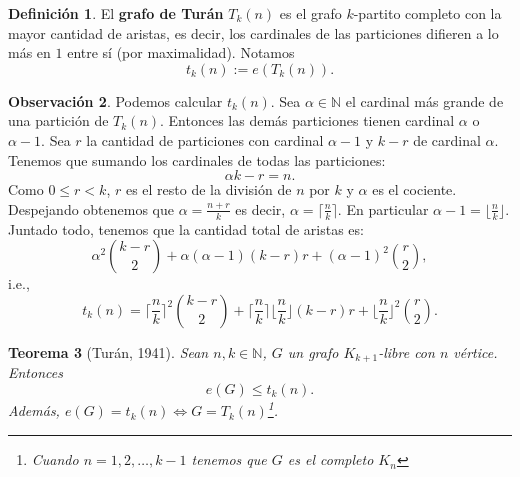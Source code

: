 \documentclass[12pt]{report}
\theoremstyle{plain}
\newtheorem{theorem}{Teorema}[section]
\theoremstyle{definition}
\newtheorem{definition}[theorem]{Definición}
\newtheorem{obs}[theorem]{Observación}
\newcommand{\naturals}{\mathbb{N}}
\begin{document}
\begin{definition}
El \textbf{grafo de Turán} $T_k (n)$ es el grafo $k$-partito completo con la mayor cantidad de aristas, es decir, los cardinales de las particiones difieren a lo más en $1$ entre sí (por maximalidad). Notamos
\[
    t_k(n) := e(T_k (n)).
\]
\end{definition}

\begin{obs}
Podemos calcular $t_k(n)$. Sea $\alpha \in \naturals$ el cardinal más grande de una partición de $T_k (n)$. Entonces las demás particiones tienen cardinal $\alpha$ o $\alpha -1$. Sea $r$ la cantidad de particiones con cardinal $\alpha -1$ y $k-r$ de cardinal $\alpha$. Tenemos que sumando los cardinales de todas las particiones:
\[
    \alpha k - r = n.
\]
Como $0 \leq r < k$, $r$ es el resto de la división de $n$ por $k$ y $\alpha$ es el cociente. Despejando obtenemos que $\alpha = \frac{n+r}{k}$ es decir, $\alpha = \lceil \frac{n}{k} \rceil$. En particular $\alpha -1 = \lfloor \frac{n}{k} \rfloor$. Juntado todo, tenemos que la cantidad total de aristas es:
\[
    \alpha^2 \binom{k-r}2 + \alpha (\alpha -1) (k-r)r + (\alpha-1)^2 \binom{r}2,
\]
i.e.,
\[
    \boxed{t_k(n) = \lceil \frac{n}{k} \rceil^2 \binom{k-r}2 + \lceil \frac{n}{k} \rceil \lfloor \frac{n}{k} \rfloor (k-r) r + \lfloor \frac{n}{k} \rfloor^2 \binom r 2.}
\]
\end{obs}


\begin{theorem}[Turán, 1941]\label{th:teorema de Turan todo grafo K_k+1 libre en n vertices tiene cantidad de aristas e < t_k (n)}
Sean $n,k \in \naturals$, $G$ un grafo $K_{k+1}$-libre con $n$ vértice. Entonces
\[
    e(G) \leq t_k (n).
\]
Además, $e(G) = t_k (n) \Leftrightarrow G = T_k (n)$\footnote{Cuando $n = 1,2, \ldots, k-1$ tenemos que $G$ es el completo $K_n$}.
\end{theorem}
\end{document}
